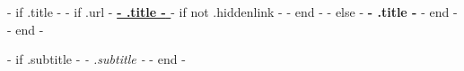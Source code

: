 {{- if .title -}}
{{- if .url -}}
	\textbf{\href{ {{- .url -}} }{ {{- .title -}} }}
	{{- if not .hiddenlink -}}
		{ }
	{{- end -}}
{{- else -}}
	\textbf{ {{- .title -}} }
{{- end -}}
{{- end -}}

{{- if .subtitle -}}
	\textit{ - {{ .subtitle -}} }
{{- end -}}